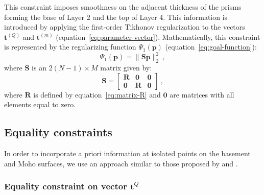 \documentclass[manuscript]{geophysics}
\begin{document}
This constraint imposes smoothness on the adjacent thickness of the prisms forming the
base of Layer 2 and the top of Layer 4. 
This information is introduced by applying the first-order Tikhonov regularization
\citep{aster-etal2005} to the vectors $\mathbf{t}^{(Q)}$ and $\mathbf{t}^{(m)}$ 
(equation~\ref{eq:parameter-vector}). 
Mathematically, this constraint is represented by the regularizing function
$\Psi_{1}(\mathbf{p})$ (equation~\ref{eq:goal-function}):
\begin{equation}
\Psi_{1}(\mathbf{p}) = \| \mathbf{S}\mathbf{p} \|_{2}^{2} \: ,
\label{eq:smootheness-contraint}
\end{equation}
where $\mathbf{S}$ is an $2 \left( N-1 \right) \times M$ matrix given by:
\begin{equation}
\mathbf{S} = \begin{bmatrix}
\mathbf{R} & \mathbf{0} & \mathbf{0} \\
\mathbf{0} & \mathbf{R} & \mathbf{0}
\end{bmatrix} \: ,
\label{eq:matrix-S}
\end{equation}
where $\mathbf{R}$ is defined by equation~\ref{eq:matrix-R} and $\mathbf{0}$
are matrices with all elements equal to zero.


\subsection{Equality constraints}

In order to incorporate a priori information at isolated points on the basement
and Moho surfaces, we use an approach similar to those proposed by
\citet{barbosa-etal1997} and \citet{barbosa-etal1999b}. 

\subsubsection*{Equality constraint on vector $\mathbf{t}^{Q}$}
\end{document}
